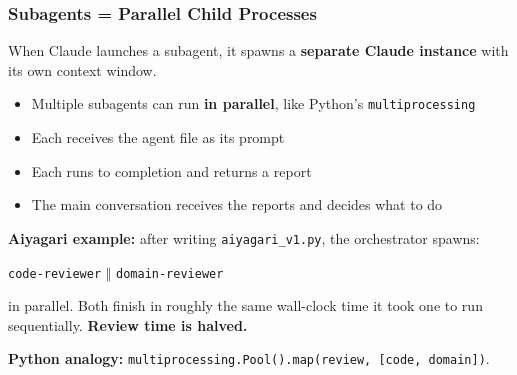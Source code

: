 \documentclass[10pt,english,aspectratio=169]{beamer}
\begin{document}
\begin{frame}
\frametitle{Subagents = Parallel Child Processes}

When Claude launches a subagent, it spawns a \textbf{separate Claude instance} with its own context window.

\vspace{0.3cm}

\begin{itemize}
    \item Multiple subagents can run \textbf{in parallel}, like Python's \texttt{multiprocessing}
    \item Each receives the agent file as its prompt
    \item Each runs to completion and returns a report
    \item The main conversation receives the reports and decides what to do
\end{itemize}

\vspace{0.3cm}

\textbf{Aiyagari example:} after writing \texttt{aiyagari\_v1.py}, the orchestrator spawns:
\begin{center}
\texttt{code-reviewer} \quad \textbf{$\Vert$} \quad \texttt{domain-reviewer}
\end{center}
in parallel. Both finish in roughly the same wall-clock time it took one to run sequentially. \textbf{Review time is halved.}

\vspace{0.2cm}

\textbf{Python analogy:} \texttt{multiprocessing.Pool().map(review, [code, domain])}.
\end{frame}
\end{document}
